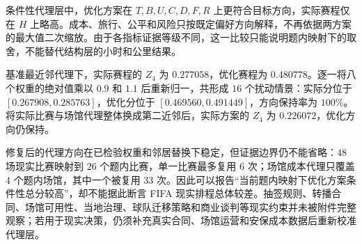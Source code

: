 条件性代理层中，优化方案在 $T,B,U,C,D,F,R$ 上更符合目标方向，实际赛程仅在 $H$ 上略高。成本、旅行、公平和风险只按既定偏好方向解释，不再依据两方案的最大值二次缩放。由于各指标证据等级不同，这一比较只能说明题内映射下的取舍，不能替代结构层的小时和公里结果。

基准最近邻代理下，实际赛程的 $Z_4$ 为 $0.277058$，优化赛程为 $0.480778$。逐一将八个权重的绝对值乘以 $0.9$ 和 $1.1$ 后重新归一，共形成 $16$ 个扰动情景：实际分位于 $[0.267908,0.285763]$，优化分位于 $[0.469560,0.491449]$，方向保持率为 $100\%$。将实际比赛与场馆代理整体换成第二近邻后，实际方案的 $Z_4$ 为 $0.226072$，优化方向仍保持。

修复后的代理方向在已检验权重和邻居替换下稳定，但证据边界仍不能省略：$48$ 场现实比赛映射到 $26$ 个题内比赛，单一比赛最多复用 $6$ 次；场馆成本代理只覆盖 $4$ 个题内场馆，其中一个被复用 $33$ 次。因此可以报告“当前题内映射下优化方案条件性总分较高”，却不能据此断言 FIFA 现实排程总体较差。抽签规则、转播合同、场馆可用性、当地治理、球队迁移策略和商业谈判等现实约束并未被附件完整观察；若用于现实决策，仍须补充真实合同、场馆运营和安保成本数据后重新校准代理层。
